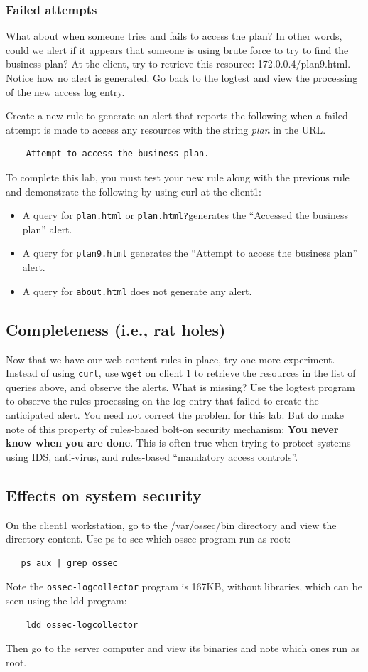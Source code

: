 \subsubsection{Failed attempts}
What about when someone tries
and fails to access the plan?  In other words, could we alert if it appears that someone is using brute force to try
to find the business plan?  At the client, try to retrieve this resource: 172.0.0.4/plan9.html.  Notice how no alert is
generated.  Go back to the logtest and view the processing of the new access log entry.

Create a new rule to generate an alert that reports the following when a failed attempt is made to access any 
resources with the string \textit{plan} in the URL.
\begin{verbatim}
    Attempt to access the business plan.
\end{verbatim}


\noindent To complete this lab, you must test your new rule along with the previous rule and demonstrate the following
by using curl at the client1:
\begin{itemize}
\item A query for {\tt plan.html} or {\tt plan.html?}generates the ``Accessed the business plan'' alert.
\item A query for {\tt plan9.html} generates the ``Attempt to access the business plan'' alert.
\item A query for {\tt about.html} does not generate any alert.
\end{itemize}

\subsection{Completeness (i.e., rat holes)}
Now that we have our web content rules in place, try one more experiment.  Instead of using {\tt curl},
use {\tt wget} on client 1 to retrieve the resources in the list of queries above, and observe the alerts.  What is missing?
Use the logtest program to observe the rules processing on the log entry that failed to create the anticipated 
alert.  You need not correct the problem for this lab.  But do make note of this property of rules-based bolt-on
security mechanism:  \textbf{You never know when you are done}.   This is often true when trying to protect
systems using IDS, anti-virus,
and rules-based ``mandatory access controls''.  

\subsection{Effects on system security}
On the client1 workstation, go to the /var/ossec/bin directory and view the directory content.  Use ps to see which 
ossec program run as root:
\begin{verbatim}
   ps aux | grep ossec
\end{verbatim} Note the
{\tt ossec-logcollector} program is 167KB, without libraries, which can be seen using the ldd program:
\begin{verbatim}
    ldd ossec-logcollector
\end{verbatim}
Then go to the server computer and view its binaries and note which ones run as root.


